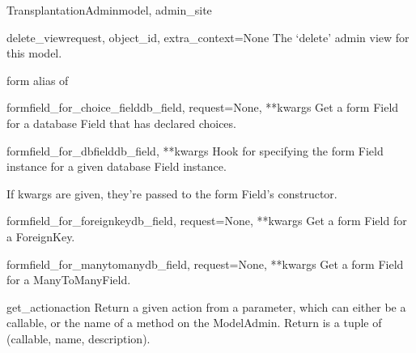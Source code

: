 \documentclass[letterpaper,10pt,english]{sphinxmanual}
\begin{document}
\begin{classdesc}{TransplantationAdmin}{model, admin\_site}
\hypertarget{data.admin.TransplantationAdmin.delete_view}{}\begin{methoddesc}{delete\_view}{request, object\_id, extra\_context=None}
The `delete' admin view for this model.
\end{methoddesc}

\hypertarget{data.admin.TransplantationAdmin.form}{}\begin{memberdesc}{form}
alias of 
\end{memberdesc}

\hypertarget{data.admin.TransplantationAdmin.formfield_for_choice_field}{}\begin{methoddesc}{formfield\_for\_choice\_field}{db\_field, request=None, **kwargs}
Get a form Field for a database Field that has declared choices.
\end{methoddesc}

\hypertarget{data.admin.TransplantationAdmin.formfield_for_dbfield}{}\begin{methoddesc}{formfield\_for\_dbfield}{db\_field, **kwargs}
Hook for specifying the form Field instance for a given database Field
instance.

If kwargs are given, they're passed to the form Field's constructor.
\end{methoddesc}

\hypertarget{data.admin.TransplantationAdmin.formfield_for_foreignkey}{}\begin{methoddesc}{formfield\_for\_foreignkey}{db\_field, request=None, **kwargs}
Get a form Field for a ForeignKey.
\end{methoddesc}

\hypertarget{data.admin.TransplantationAdmin.formfield_for_manytomany}{}\begin{methoddesc}{formfield\_for\_manytomany}{db\_field, request=None, **kwargs}
Get a form Field for a ManyToManyField.
\end{methoddesc}

\hypertarget{data.admin.TransplantationAdmin.get_action}{}\begin{methoddesc}{get\_action}{action}
Return a given action from a parameter, which can either be a callable,
or the name of a method on the ModelAdmin.  Return is a tuple of
(callable, name, description).
\end{methoddesc}


\end{classdesc}
\end{document}
